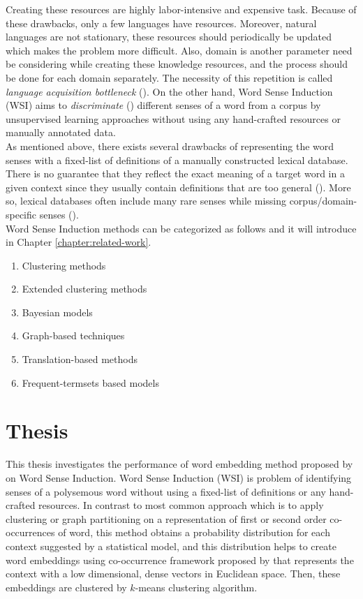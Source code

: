 Creating these resources are highly labor-intensive and expensive task. Because of these drawbacks, only a few languages have resources. Moreover, natural languages are not stationary, these resources should periodically be updated which makes the problem more difficult. Also, domain is another parameter need be considering while creating these knowledge resources, and the process should be done for each domain separately. The necessity of this repetition is called \emph{language acquisition bottleneck} (\cite{gale92work}). On the other hand, Word Sense Induction (WSI) aims to \emph{discriminate} (\cite{schutze98automatic}) different senses of a word from a corpus by unsupervised learning approaches without using any hand-crafted resources or manually annotated data.  \\

As mentioned above, there exists several drawbacks of representing the word senses with a fixed-list of definitions of a manually
constructed lexical database. There is no guarantee that they reflect the exact meaning of a target
word in a given context since they usually contain definitions that are too general (\cite{veronis04hyperlex}).
More so, lexical databases often include many rare senses while missing corpus/domain-specific senses (\cite{pantel02discovering}). \\

Word Sense Induction methods can be categorized as follows and it will introduce in Chapter \ref{chapter:related-work}.

\begin{enumerate}
\item Clustering methods
\item Extended clustering methods
\item Bayesian models
\item Graph-based techniques
\item Translation-based methods
\item Frequent-termsets based models 
\end{enumerate}


\section{Thesis}

This thesis investigates the performance of word embedding method proposed by \cite{yatbaz2012learning} on Word Sense Induction. Word Sense Induction (WSI) is problem of identifying senses of a polysemous word without using a fixed-list of definitions or any hand-crafted resources. In contrast to most common approach which is to apply clustering or graph partitioning on a representation of first or second order co-occurrences of word, this method obtains a probability distribution for each context suggested by a statistical model, and this distribution helps to create word embeddings using co-occurrence framework proposed by \cite{globerson2004euclidean} that represents the context with a low dimensional, dense vectors in Euclidean space. Then, these embeddings are clustered by $k$-means clustering algorithm.


